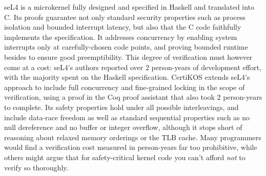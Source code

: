seL4 \cite{sel4} is a microkernel fully designed and specified in Haskell and translated into C.
Its proofs guarantee not only standard security properties such as process isolation and bounded interrupt latency,
but also that the C code faithfully implements the specification.
It addresses concurrency by enabling system interrupts only at carefully-chosen code points,
and proving bounded runtime besides to ensure good preemptibility.
This degree of verification must however come at a cost:
seL4's authors reported over 2 person-years of development effort, with the majority spent on the Haskell specification.
%
%
CertiKOS \cite{certikos} extends seL4's approach to include full concurrency and fine-grained locking
in the scope of verification,
using a proof in the Coq proof assistant
\cite{coq}
that also took 2 person-years to complete.
Its safety properties hold under all possible interleavings,
and include data-race freedom as well as standard sequential properties
such as no null dereference and no buffer or integer overflow,
although it stops short of reasoning about relaxed memory orderings or the TLB cache.
Many programmers would find a verification cost measured in person-years far too prohibitive,
while others might argue that for safety-critical kernel code you can't afford {\em not} to verify so thoroughly.

